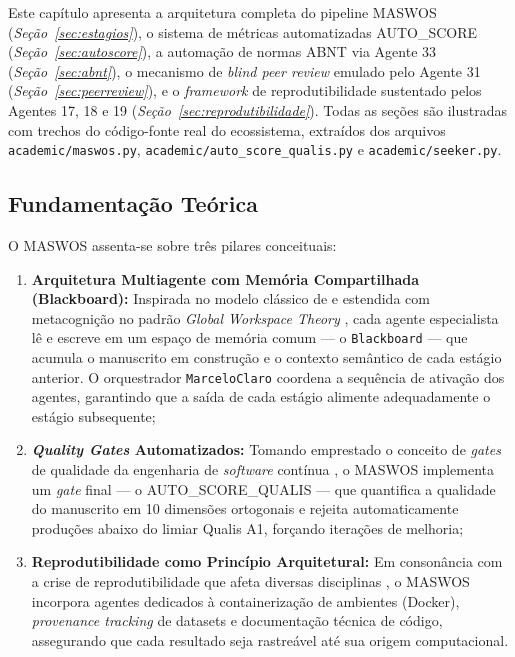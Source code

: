 Este capítulo apresenta a arquitetura completa do pipeline MASWOS
(\textit{Seção~\ref{sec:estagios}}), o sistema de métricas
automatizadas AUTO\_SCORE (\textit{Seção~\ref{sec:autoscore}}), a
automação de normas ABNT via Agente 33
(\textit{Seção~\ref{sec:abnt}}), o mecanismo de \textit{blind peer
review} emulado pelo Agente 31
(\textit{Seção~\ref{sec:peerreview}}), e o \textit{framework} de
reprodutibilidade sustentado pelos Agentes 17, 18 e 19
(\textit{Seção~\ref{sec:reprodutibilidade}}). Todas as seções são
ilustradas com trechos do código-fonte real do ecossistema,
extraídos dos arquivos \texttt{academic/maswos.py},
\texttt{academic/auto\_score\_qualis.py} e
\texttt{academic/seeker.py}.

\subsection{Fundamentação Teórica}
\label{sec:fundamentacao}

O MASWOS assenta-se sobre três pilares conceituais:

\begin{enumerate}
    \item \textbf{Arquitetura Multiagente com Memória Compartilhada
    (Blackboard):} Inspirada no modelo clássico de
    \cite{Hayes-Roth1985_Blackboard} e estendida com metacognição
    no padrão \textit{Global Workspace Theory} \cite{Baars1988_GWT,
    Shanahan2006_GWT}, cada agente especialista lê e escreve em um
    espaço de memória comum — o \texttt{Blackboard} — que acumula o
    manuscrito em construção e o contexto semântico de cada estágio
    anterior. O orquestrador \texttt{MarceloClaro} coordena a
    sequência de ativação dos agentes, garantindo que a saída de
    cada estágio alimente adequadamente o estágio subsequente;

    \item \textbf{\textit{Quality Gates} Automatizados:} Tomando
    emprestado o conceito de \textit{gates} de qualidade da
    engenharia de \textit{software} contínua \cite{Humble2010_CD,
    Kim2016_DevOps}, o MASWOS implementa um \textit{gate} final —
    o AUTO\_SCORE\_QUALIS — que quantifica a qualidade do manuscrito
    em 10 dimensões ortogonais e rejeita automaticamente produções
    abaixo do limiar Qualis A1, forçando iterações de melhoria;

    \item \textbf{Reprodutibilidade como Princípio Arquitetural:}
    Em consonância com a crise de reprodutibilidade que afeta
    diversas disciplinas \cite{Baker2016_Reproducibility,
    Ioannidis2005_WhyMost}, o MASWOS incorpora agentes dedicados à
    containerização de ambientes (Docker), \textit{provenance
    tracking} de datasets e documentação técnica de código,
    assegurando que cada resultado seja rastreável até sua origem
    computacional.
\end{enumerate}

